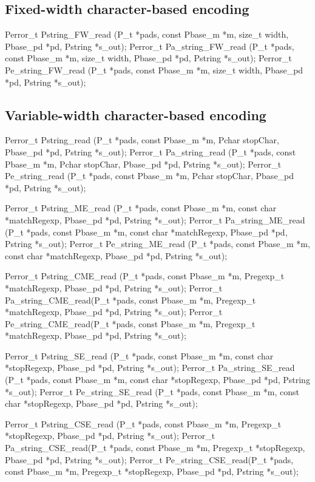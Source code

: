 \subsection{Fixed-width character-based encoding}

\aedBegin{}
\aedEnd{}

\begin{tinycodeaux}{\leftmargin=0in}
Perror_t Pstring_FW_read   (P_t *pads, const Pbase_m *m, size_t width,
			    Pbase_pd *pd, Pstring *s_out);
Perror_t Pa_string_FW_read (P_t *pads, const Pbase_m *m, size_t width,
			    Pbase_pd *pd, Pstring *s_out);
Perror_t Pe_string_FW_read (P_t *pads, const Pbase_m *m, size_t width,
			    Pbase_pd *pd, Pstring *s_out);
\end{tinycodeaux}

\subsection{Variable-width character-based encoding}

\aedBegin{}
\aedEnd{}

\begin{tinycodeaux}{\leftmargin=0in}
Perror_t Pstring_read      (P_t *pads, const Pbase_m *m, Pchar stopChar,
			    Pbase_pd *pd, Pstring *s_out);
Perror_t Pa_string_read    (P_t *pads, const Pbase_m *m, Pchar stopChar,
			    Pbase_pd *pd, Pstring *s_out);
Perror_t Pe_string_read    (P_t *pads, const Pbase_m *m, Pchar stopChar,
			    Pbase_pd *pd, Pstring *s_out);

Perror_t Pstring_ME_read   (P_t *pads, const Pbase_m *m, const char *matchRegexp,
			    Pbase_pd *pd, Pstring *s_out);
Perror_t Pa_string_ME_read (P_t *pads, const Pbase_m *m, const char *matchRegexp,
			    Pbase_pd *pd, Pstring *s_out);
Perror_t Pe_string_ME_read (P_t *pads, const Pbase_m *m, const char *matchRegexp,
			    Pbase_pd *pd, Pstring *s_out);

Perror_t Pstring_CME_read  (P_t *pads, const Pbase_m *m, Pregexp_t *matchRegexp,
			    Pbase_pd *pd, Pstring *s_out);
Perror_t Pa_string_CME_read(P_t *pads, const Pbase_m *m, Pregexp_t *matchRegexp,
			    Pbase_pd *pd, Pstring *s_out);
Perror_t Pe_string_CME_read(P_t *pads, const Pbase_m *m, Pregexp_t *matchRegexp,
			    Pbase_pd *pd, Pstring *s_out);

Perror_t Pstring_SE_read   (P_t *pads, const Pbase_m *m, const char *stopRegexp,
			    Pbase_pd *pd, Pstring *s_out);
Perror_t Pa_string_SE_read (P_t *pads, const Pbase_m *m, const char *stopRegexp,
			    Pbase_pd *pd, Pstring *s_out);
Perror_t Pe_string_SE_read (P_t *pads, const Pbase_m *m, const char *stopRegexp,
			    Pbase_pd *pd, Pstring *s_out);

Perror_t Pstring_CSE_read  (P_t *pads, const Pbase_m *m, Pregexp_t *stopRegexp,
			    Pbase_pd *pd, Pstring *s_out);
Perror_t Pa_string_CSE_read(P_t *pads, const Pbase_m *m, Pregexp_t *stopRegexp,
			    Pbase_pd *pd, Pstring *s_out);
Perror_t Pe_string_CSE_read(P_t *pads, const Pbase_m *m, Pregexp_t *stopRegexp,
			    Pbase_pd *pd, Pstring *s_out);
\end{tinycodeaux}

